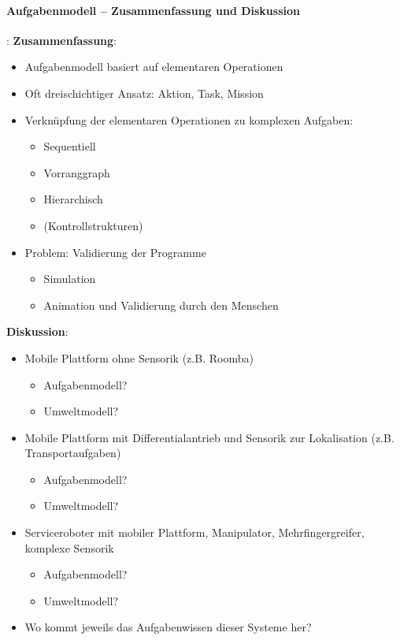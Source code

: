 \paragraph*{Aufgabenmodell -- Zusammenfassung und Diskussion}:\newline
\textbf{Zusammenfassung}:
\begin{itemize}
\item Aufgabenmodell basiert auf elementaren Operationen
\item Oft dreischichtiger Ansatz: Aktion, Task, Mission
\item Verknüpfung der elementaren Operationen zu komplexen Aufgaben:
\begin{itemize}
\item Sequentiell
\item Vorranggraph
\item  Hierarchisch
\item (Kontrollstrukturen)
\end{itemize}
\item Problem: Validierung der Programme
\begin{itemize}
\item Simulation
\item Animation und Validierung durch den Menschen
\end{itemize}
\end{itemize}

\textbf{Diskussion}:
\begin{itemize}
\item Mobile Plattform ohne Sensorik (z.B. Roomba)
\begin{itemize}
\item Aufgabenmodell?
\item Umweltmodell?
\end{itemize}
\item Mobile Plattform mit Differentialantrieb und Sensorik zur Lokalisation (z.B. Transportaufgaben)
\begin{itemize}
\item Aufgabenmodell?
\item Umweltmodell?
\end{itemize}
\item Serviceroboter mit mobiler Plattform, Manipulator, Mehrfingergreifer, komplexe Sensorik\begin{itemize}
\item Aufgabenmodell?
\item Umweltmodell?
\end{itemize}
\item Wo kommt jeweils das Aufgabenwissen dieser Systeme her?
\end{itemize}